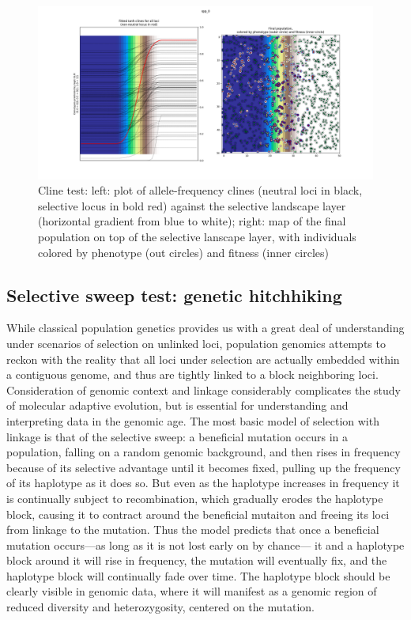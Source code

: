 ﻿\documentclass{article}
\begin{document}
\begin{figure}[h!]
\includegraphics[width=175mm]{./img/validation/cline/cline_adaptation_phi_0pt01_2500_timesteps.png}
        \caption{Cline test: left: plot of allele-frequency clines (neutral loci in black, selective locus in bold red) against the selective landscape layer (horizontal gradient from blue to white); right: map of the final population on top of the selective lanscape layer, with individuals colored by phenotype (out circles) and fitness (inner circles)}
\end{figure}


\subsection{Selective sweep test: genetic hitchhiking}
While classical population genetics provides us with a great
deal of understanding under scenarios of selection 
on unlinked loci, population genomics attempts to reckon
with the reality that all loci under selection are actually
embedded within a contiguous genome, and thus are tightly linked
to a block neighboring loci. Consideration of genomic context and linkage
considerably complicates the study of molecular adaptive evolution, but is
essential for understanding and interpreting data in the genomic age. The
most basic model of selection with linkage is that of the selective sweep:
a beneficial mutation occurs in a population, falling on a
random genomic background, and then rises in frequency because of its
selective advantage until it becomes fixed, pulling up the frequency of its
haplotype as it does so. But even as the haplotype increases in frequency it is
continually subject to recombination, which gradually erodes the haplotype block,
causing it to contract around the beneficial mutaiton and freeing its
loci from linkage to the mutation. Thus the model predicts that once a
beneficial mutation occurs---as long as it is not lost early on by chance---
it and a haplotype block around it will rise in frequency, the mutation will
eventually fix, and the haplotype block will continually fade over time.
The haplotype block should be clearly visible in genomic data, where it will
manifest as a genomic region of reduced diversity and heterozygosity, centered
on the mutation.
\end{document}
